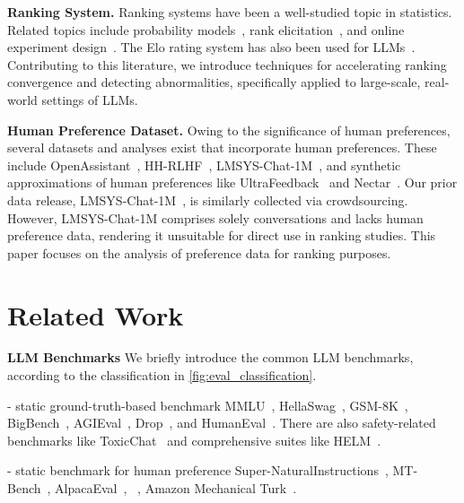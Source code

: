 \textbf{Ranking System.}
Ranking systems have been a well-studied topic in statistics. Related topics include probability models~\cite{mm_bradley_terry,tie_in_bradley_terry}, rank elicitation~\cite{online_rank,pmlr-v32-busa-fekete14,preference_rank_elicitation}, and online experiment design~\cite{sequential_design, karimi2021online}.
The Elo rating system has also been used for LLMs~\cite{bai2022training,boubdir2023elo}.
Contributing to this literature, we introduce techniques for accelerating ranking convergence and detecting abnormalities, specifically applied to large-scale, real-world settings of LLMs.

\textbf{Human Preference Dataset.}
Owing to the significance of human preferences, several datasets and analyses exist that incorporate human preferences. These include OpenAssistant~\cite{kopf2023openassistant}, HH-RLHF~\cite{bai2022training}, LMSYS-Chat-1M~\cite{zheng2023lmsyschat1m}, and synthetic approximations of human preferences like UltraFeedback~\cite{cui2023ultrafeedback} and Nectar~\cite{starling2023}.
Our prior data release, LMSYS-Chat-1M~\cite{zheng2023lmsyschat1m}, is similarly collected via crowdsourcing. However, LMSYS-Chat-1M comprises solely conversations and lacks human preference data, rendering it unsuitable for direct use in ranking studies. This paper focuses on the analysis of preference data for ranking purposes.


\iffalse

\section{Related Work}

\textbf{LLM Benchmarks}
We briefly introduce the common LLM benchmarks, according to the classification in \autoref{fig:eval_classification}.

- static ground-truth-based benchmark
MMLU~\cite{hendrycks2020measuring}, HellaSwag~\cite{zellers2019hellaswag}, GSM-8K~\cite{cobbe2021gsm},
BigBench~\cite{srivastava2023beyond}, AGIEval~\cite{zhong2023agieval}, Drop~\cite{dua2019drop}, and HumanEval~\cite{chen2021evaluating}. There are also safety-related benchmarks like ToxicChat~\cite{toxicchat} and comprehensive suites like HELM~\cite{liang2022holistic}.

- static benchmark for human preference
Super-NaturalInstructions~\cite{wang2022super}, MT-Bench~\cite{zheng2023judging}, AlpacaEval~\cite{alpaca_eval}, ~\cite{chiang-lee-2023-large},
Amazon Mechanical Turk~\cite{karpinska-etal-2021-perils,koala_blogpost_2023}.


